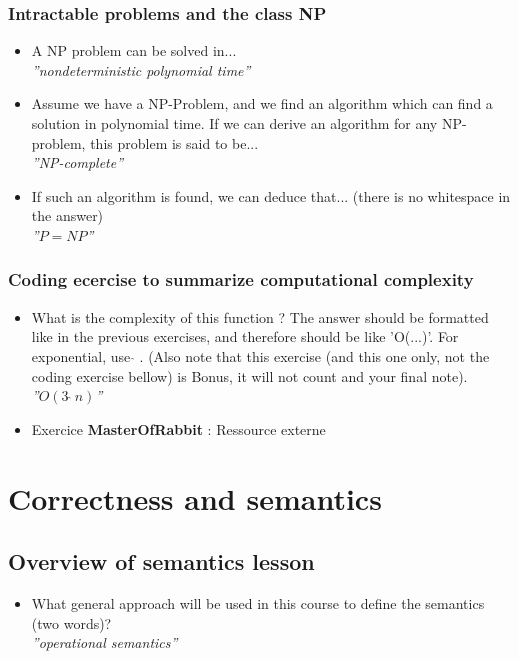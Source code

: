 \documentclass[fr,license=none]{../../../eplsummary}
\begin{document}
			\subsubsection*{Intractable problems and the class NP}
				\begin{itemize}
					\item A NP problem can be solved in...\\
						\textit{''nondeterministic polynomial time''}
					\item Assume we have a NP-Problem, and we find an algorithm which can find a solution in polynomial time. If we can derive an algorithm for any NP-problem, this problem is said to be...\\
						\textit{''NP-complete''}
					\item If such an algorithm is found, we can deduce that... (there is no whitespace in the answer)\\
						\textit{''$P=NP$''}
				\end{itemize}
			\subsubsection*{Coding ecercise to summarize computational complexity}
				\begin{itemize}
					\item What is the complexity of this function ? The answer should be formatted like in the previous exercises, and therefore should be like 'O(...)'. For exponential, use $\hat{}$ . (Also note that this exercise (and this one only, not the coding exercise bellow) is Bonus, it will not count and your final note).\\
						\textit{''$O(3\:\hat{}\:n)$''}
					\item Exercice \textbf{MasterOfRabbit} : Ressource externe\\
						
						
				\end{itemize}
				
	\section{Correctness and semantics}
		\subsection{Overview of semantics lesson}
			\begin{itemize}
				\item What general approach will be used in this course to define the semantics (two words)?\\
					\textit{''operational semantics''}
			\end{itemize}
\end{document}
